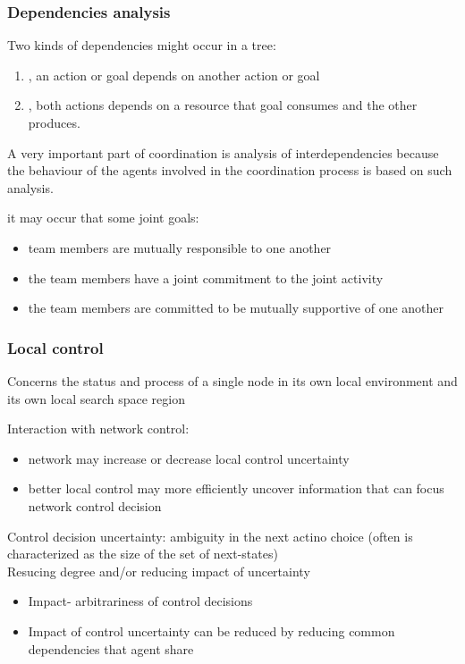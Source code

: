 \subsubsection{Dependencies analysis}
Two kinds of dependencies might occur in a tree:
\begin{enumerate}
\item {}, an action or goal depends on another action or goal
\item {}, both actions depends on a resource that goal consumes and the other produces.
\end{enumerate}
A very important part of coordination is analysis of interdependencies because the behaviour of the agents involved in the coordination process is based on such analysis.

it may occur that some joint goals:
\begin{itemize}
\item team members are mutually responsible to one another
\item the team members have a joint commitment to the joint activity
\item the team members are committed to be mutually supportive of one another
\end{itemize}

\subsubsection{Local control}
Concerns the status and process of a single node in its own local environment and its own local  search space region

Interaction with network control:
\begin{itemize}
\item network may increase or decrease local control uncertainty
\item better local control may more efficiently uncover information that can focus network control decision
\end{itemize}

Control decision uncertainty: ambiguity in the next actino choice (often is characterized as the size of the set of next-states)\\
Resucing degree and/or reducing impact of uncertainty
\begin{itemize}
\item Impact- arbitrariness of control decisions
\item Impact of control uncertainty can be reduced by reducing common dependencies that agent share
\end{itemize}


